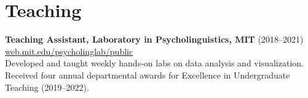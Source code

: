 \documentclass[11pt,]{article}
\newcommand{\project}[4]{
  \textbf{#1} #3 \hfill \small \href{http://#2}{#2} \normalsize \\ \hangindent=15pt #4
}
\begin{document}
\hypertarget{teaching}{%
\section{\texorpdfstring{\faUsers \hspace{1pt}
Teaching}{ Teaching}}\label{teaching}}

\project{Teaching Assistant, Laboratory in Psycholinguistics, MIT}{web.mit.edu/psycholinglab/public}{(2018--2021)}{Developed and taught weekly hands-on labs on data analysis and visualization.\\Received four annual departmental awards for Excellence in Undergraduate Teaching (2019--2022).}
\end{document}
